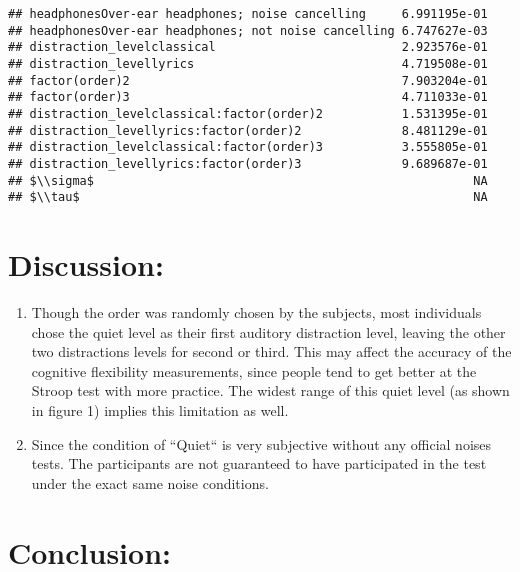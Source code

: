 \documentclass[]{article}
\providecommand{\tightlist}{%
  \setlength{\itemsep}{0pt}\setlength{\parskip}{0pt}}
\begin{document}
\begin{verbatim}
## headphonesOver-ear headphones; noise cancelling     6.991195e-01
## headphonesOver-ear headphones; not noise cancelling 6.747627e-03
## distraction_levelclassical                          2.923576e-01
## distraction_levellyrics                             4.719508e-01
## factor(order)2                                      7.903204e-01
## factor(order)3                                      4.711033e-01
## distraction_levelclassical:factor(order)2           1.531395e-01
## distraction_levellyrics:factor(order)2              8.481129e-01
## distraction_levelclassical:factor(order)3           3.555805e-01
## distraction_levellyrics:factor(order)3              9.689687e-01
## $\\sigma$                                                     NA
## $\\tau$                                                       NA
\end{verbatim}

\hypertarget{discussion}{%
\section{Discussion:}\label{discussion}}

\begin{enumerate}
\def\labelenumi{\arabic{enumi}.}
\tightlist
\item
  Though the order was randomly chosen by the subjects, most individuals
  chose the quiet level as their first auditory distraction level,
  leaving the other two distractions levels for second or third. This
  may affect the accuracy of the cognitive flexibility measurements,
  since people tend to get better at the Stroop test with more practice.
  The widest range of this quiet level (as shown in figure 1) implies
  this limitation as well.
\item
  Since the condition of ``Quiet`` is very subjective without any
  official noises tests. The participants are not guaranteed to have
  participated in the test under the exact same noise conditions.
\end{enumerate}

\hypertarget{conclusion}{%
\section{Conclusion:}\label{conclusion}}
\end{document}
